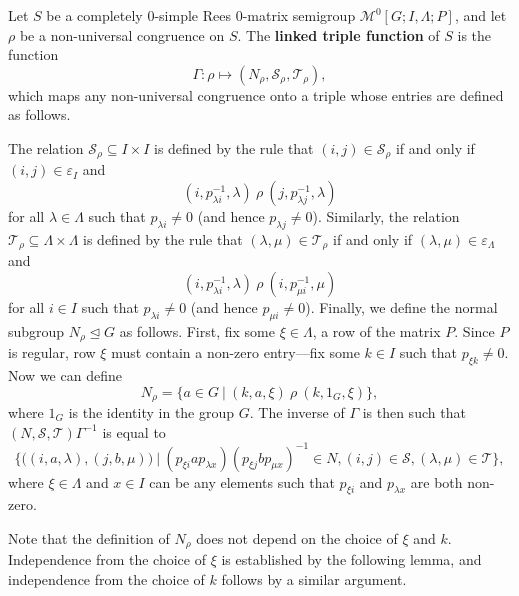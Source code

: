 \begin{definition}
  \label{def:linked-triple-function}
  Let $S$ be a completely 0-simple Rees 0-matrix semigroup
  $\mathcal{M}^0[G;I,\Lambda;P]$, and let $\rho$ be a non-universal congruence
  on $S$.
  The \textbf{linked triple function} of $S$ is the function
  $$\Gamma: \rho \mapsto (N_\rho, \mathcal{S}_\rho, \mathcal{T}_\rho),$$
  which maps any non-universal congruence onto a triple whose entries are
  defined as follows.

  The relation $\mathcal{S}_\rho \subseteq I \times I$ is defined by the rule that
  $(i,j) \in \mathcal{S}_\rho$ if and only if $(i,j) \in \varepsilon_I$ and
  $$(i, p_{\lambda i}^{-1}, \lambda) ~\rho~ (j, p_{\lambda j}^{-1}, \lambda)$$
  for all $\lambda \in \Lambda$ such that $p_{\lambda i} \neq 0$ (and hence
  $p_{\lambda j} \neq 0$).  Similarly, the relation
  $\mathcal{T}_\rho \subseteq \Lambda \times \Lambda$ is defined by the rule that
  $(\lambda,\mu) \in \mathcal{T}_\rho$ if and only if
  $(\lambda,\mu) \in \varepsilon_\Lambda$ and
  $$(i, p_{\lambda i}^{-1}, \lambda) ~\rho~ (i, p_{\mu i}^{-1}, \mu)$$
  for all $i \in I$ such that $p_{\lambda i} \neq 0$ (and hence
  $p_{\mu i} \neq 0$).  Finally, we define the normal subgroup
  $N_\rho \trianglelefteq G$ as follows.  First, fix some $\xi \in \Lambda$, a
  row of the matrix $P$.  Since $P$ is regular, row $\xi$ must contain a
  non-zero entry---fix some $k \in I$ such that $p_{\xi k} \neq 0$.  Now we can
  define
  $$N_\rho = \{a \in G ~|~ (k, a, \xi) ~\rho~ (k, 1_G, \xi)\},$$
  where $1_G$ is the identity in the group $G$.
  The inverse of $\Gamma$ is then such that
  $(N, \mathcal{S}, \mathcal{T})\Gamma^{-1}$ is equal to
  $$\Big\{
  \big((i, a, \lambda), (j, b, \mu)\big) ~\Big|~
  (p_{\xi i} a p_{\lambda x}) (p_{\xi j} b p_{\mu x})^{-1} \in N,
  (i,j) \in \mathcal{S},
  (\lambda,\mu) \in \mathcal{T}
  \Big\},$$
  where $\xi \in \Lambda$ and $x \in I$ can be any elements such that
  $p_{\xi i}$ and $p_{\lambda x}$ are both non-zero.
\end{definition}

Note that the definition of $N_\rho$ does not depend on the choice of $\xi$ and
$k$.  Independence from the choice of $\xi$ is established by the following
lemma, and independence from the choice of $k$ follows by a similar argument.

